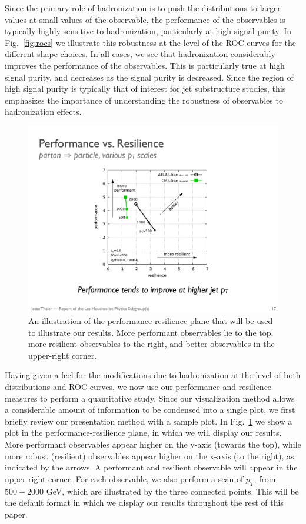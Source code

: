 \documentclass[11pt,letterpaper]{article}
\DeclareRobustCommand{\Fig}[1]{Fig.~\ref{#1}}
\begin{document}
Since the primary role of hadronization is to push the distributions to larger values at small values of the observable, the performance of the observables is typically highly sensitive to hadronization, particularly at high signal purity. In \Fig{fig:rocs} we illustrate this robustness at the level of the ROC curves for the different shape choices. In all cases, we see that hadronization considerably improves the performance of the observables. This is particularly true at high signal purity, and decreases as the signal purity is decreased. Since the region of high signal purity is typically that of interest for jet substructure studies, this emphasizes the importance of understanding the robustness of observables to hadronization effects.

\begin{figure}
\begin{center}
\includegraphics[width=0.4\columnwidth]{figures/sweep_pt}
\end{center}
\caption{An illustration of the performance-resilience plane that will be used to illustrate our results. More performant observables lie to the top, more resilient observables to the right, and better observables in the upper-right corner.}
\label{fig:sweep_pt}
\end{figure}



Having given a feel for the modifications due to hadronization at the level of both distributions and ROC curves, we now use our performance and resilience measures to perform a quantitative study. Since our visualization method allows a considerable amount of information to be condensed into a single plot, we first briefly review our presentation method with a sample plot. In \Fig{fig:sweep_pt} we show a plot in the performance-resilience plane, in which we will display our results. More performant observables appear higher on the y-axis (towards the top), while more robust (resilient) observables appear higher on the x-axis (to the right), as indicated by the arrows. A performant and resilient observable will appear in the upper right corner. For each observable, we also perform a scan of $p_T$, from $500-2000$ GeV, which are illustrated by the three connected points. This will be the default format in which we display our results throughout the rest of this paper.
\end{document}
